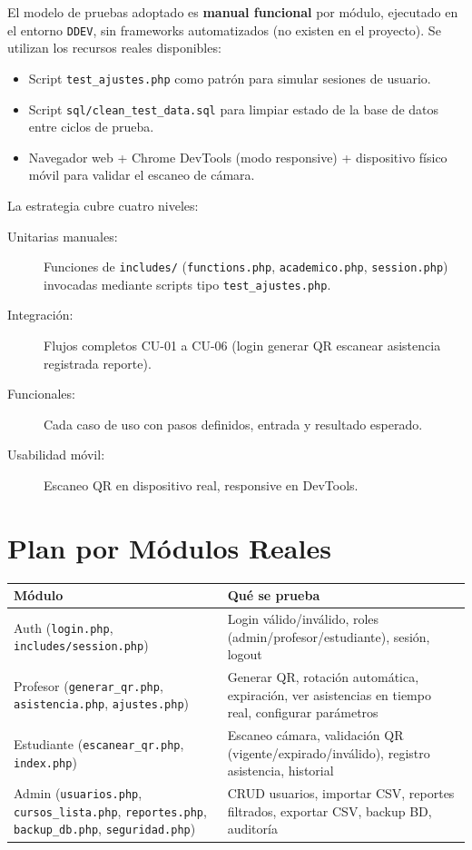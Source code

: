 \documentclass[12pt, letterpaper, oneside]{report}
\begin{document}
El modelo de pruebas adoptado es \textbf{manual funcional} por m\'odulo, ejecutado en el entorno \texttt{DDEV}, sin frameworks automatizados (no existen en el proyecto). Se utilizan los recursos reales disponibles:

\begin{itemize}
  \item Script \texttt{test\_ajustes.php} como patr\'on para simular sesiones de usuario.
  \item Script \texttt{sql/clean\_test\_data.sql} para limpiar estado de la base de datos entre ciclos de prueba.
  \item Navegador web + Chrome DevTools (modo responsive) + dispositivo f\'isico m\'ovil para validar el escaneo de c\'amara.
\end{itemize}

La estrategia cubre cuatro niveles:

\begin{description}
  \item[Unitarias manuales:] Funciones de \texttt{includes/} (\texttt{functions.php}, \texttt{academico.php}, \texttt{session.php}) invocadas mediante scripts tipo \texttt{test\_ajustes.php}.
  \item[Integraci\'on:] Flujos completos CU-01 a CU-06 (login \textrightarrow generar QR \textrightarrow escanear \textrightarrow asistencia registrada \textrightarrow reporte).
  \item[Funcionales:] Cada caso de uso con pasos definidos, entrada y resultado esperado.
  \item[Usabilidad m\'ovil:] Escaneo QR en dispositivo real, responsive en DevTools.
\end{description}

\section{Plan por M\'odulos Reales}

\begin{center}
\small
\begin{tabularx}{\textwidth}{|p{5cm}|X|}
\hline
\textbf{M\'odulo} & \textbf{Qu\'e se prueba} \\
\hline
Auth (\texttt{login.php}, \texttt{includes/session.php}) & Login v\'alido/inv\'alido, roles (admin/profesor/estudiante), sesi\'on, logout \\
\hline
Profesor (\texttt{generar\_qr.php}, \texttt{asistencia.php}, \texttt{ajustes.php}) & Generar QR, rotaci\'on autom\'atica, expiraci\'on, ver asistencias en tiempo real, configurar par\'ametros \\
\hline
Estudiante (\texttt{escanear\_qr.php}, \texttt{index.php}) & Escaneo c\'amara, validaci\'on QR (vigente/expirado/inv\'alido), registro asistencia, historial \\
\hline
Admin (\texttt{usuarios.php}, \texttt{cursos\_lista.php}, \texttt{reportes.php}, \texttt{backup\_db.php}, \texttt{seguridad.php}) & CRUD usuarios, importar CSV, reportes filtrados, exportar CSV, backup BD, auditor\'ia \\
\hline
\end{tabularx}
\end{center}
\end{document}

